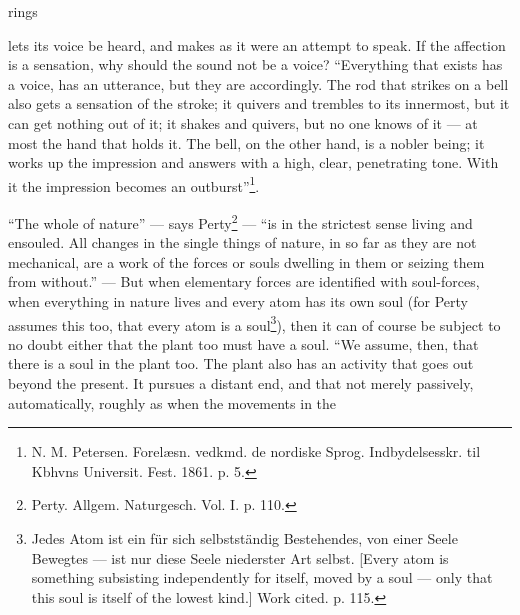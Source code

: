 \documentclass[12pt,a4paper]{book}
\begin{document}
rings

\setcounter{footnote}{0}
lets its voice be heard, and makes as it were an attempt to speak. If the affection
is a sensation, why should the sound not be a voice? ``Everything that exists has a
voice, has an utterance, but they are accordingly. The rod that strikes on a bell
also gets a sensation of the stroke; it quivers and trembles to its innermost, but
it can get nothing out of it; it shakes and quivers, but no one knows of it --- at
most the hand that holds it. The bell, on the other hand, is a nobler being; it
works up the impression and answers with a high, clear, penetrating tone. With it
the impression becomes an outburst''\footnote{N. M. Petersen. Forelæsn. vedkmd. de
nordiske Sprog. Indbydelsesskr. til Kbhvns Universit. Fest. 1861. p. 5.}.

``The whole of nature'' --- says Perty\footnote{Perty. Allgem. Naturgesch. Vol. I.
p. 110.} --- ``is in the strictest sense living and ensouled. All changes in the
single things of nature, in so far as they are not mechanical, are a work of the
forces or souls dwelling in them or seizing them from without.'' --- But when
elementary forces are identified with soul-forces, when everything in nature lives
and every atom has its own soul (for Perty assumes this too, that every atom is a
soul\footnote{Jedes Atom ist ein für sich selbstständig Bestehendes, von einer Seele
Bewegtes --- ist nur diese Seele niederster Art selbst. [Every atom is something
subsisting independently for itself, moved by a soul --- only that this soul is
itself of the lowest kind.] Work cited. p. 115.}), then it can of course be subject
to no doubt either that the plant too must have a soul. ``We assume, then, that
there is a soul in the plant too. The plant also has an activity that goes out
beyond the present. It pursues a distant end, and that not merely passively,
automatically, roughly as when the movements in the
\end{document}
